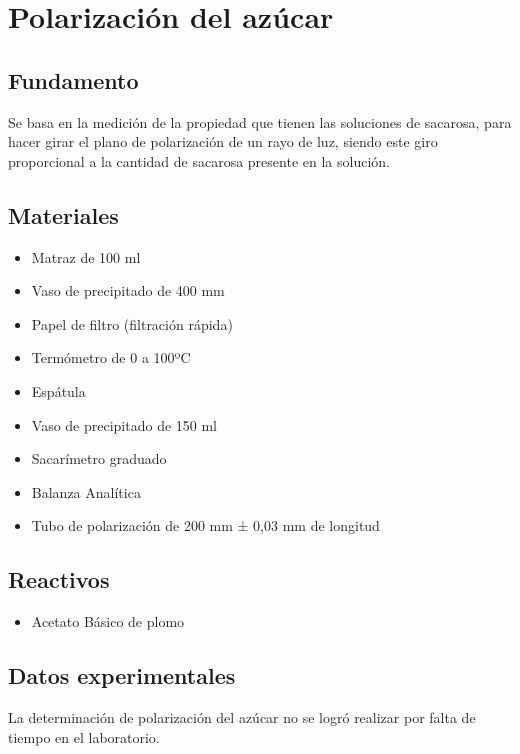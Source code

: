 \documentclass[a4paper,12pt]{article} %
\begin{document}
\newpage

\section{Polarización del azúcar}

\subsection{Fundamento} 
Se basa en la medición de la propiedad que tienen las soluciones de sacarosa, para hacer girar el plano de polarización de un rayo de luz, siendo este giro proporcional a la cantidad de sacarosa presente en la solución. 

\subsection{Materiales} 
\begin{itemize}
    \item{Matraz de 100 ml}
    \item{Vaso de precipitado de 400 mm}
    \item{Papel de filtro (filtración rápida)}
    \item{Termómetro de 0 a 100ºC}
    \item{Espátula}
    \item{Vaso de precipitado de 150 ml}  
    \item{Sacarímetro graduado}
    \item{Balanza Analítica} 
    \item{Tubo de polarización de 200 mm ± 0,03 mm de longitud } 
\end{itemize}

\subsection{Reactivos} 
\begin{itemize}
    \item{Acetato Básico de plomo} 
\end{itemize}

\subsection{Datos experimentales} 
La determinación de polarización del azúcar no se logró realizar por falta de tiempo en el laboratorio. 



\newpage
\end{document}
